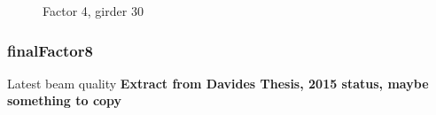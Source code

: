 \begin{figure}[!h]
  \begin{center}

  \end{center}
\caption{Factor 4, girder 30}
\label{fig:record_low_factor4_girder30}
\end{figure}






 

\subsubsection{finalFactor8}{Latest beam quality}
\textbf{Extract from Davides Thesis, 2015 status, maybe something to copy}

